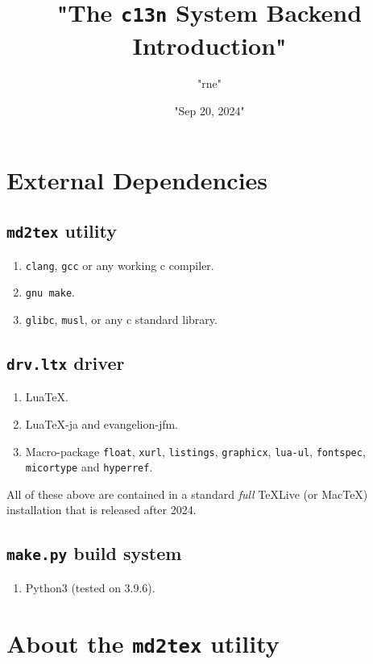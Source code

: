 \title{"The \texttt{c13n} System Backend Introduction"}
\author{"rne"}
\date{"Sep 20, 2024"}
\maketitle
\chapter{External Dependencies}
\section{\texttt{md2tex} utility}
\begin{enumerate}
\item \verb!clang!, \verb!gcc! or any working c compiler.
\item \verb!gnu make!.
\item \verb!glibc!, \verb!musl!, or any c standard library.
\end{enumerate}
\section{\texttt{drv.ltx} driver}
\begin{enumerate}
\item LuaTeX.
\item LuaTeX-ja and evangelion-jfm.
\item Macro-package \verb!float!, \verb!xurl!, \verb!listings!, \verb!graphicx!, \verb!lua-ul!, \verb!fontspec!, \verb!micortype! and \verb!hyperref!.
\end{enumerate}
All of these above are contained in a standard \textit{full} TeXLive (or MacTeX) installation that is released after 2024.\par
\section{\texttt{make.py} build system}
\begin{enumerate}
\item Python3 (tested on 3.9.6).
\end{enumerate}
\chapter{About the \texttt{md2tex} utility}
